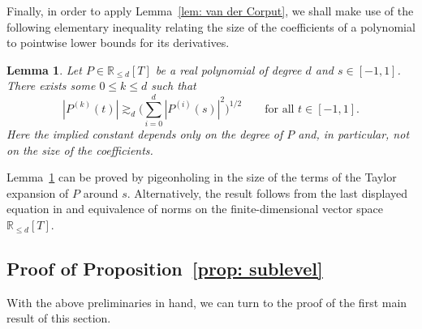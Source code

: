\documentclass[reqno]{amsart}
\numberwithin{equation}{section}
\newcommand{\R}{\mathbb{R}}
\theoremstyle{plain}
\newtheorem{lemma}[theorem]{Lemma}
\theoremstyle{definition}
\begin{document}
Finally, in order to apply Lemma~\ref{lem: van der Corput}, we shall make use of the following elementary inequality relating the size of the coefficients of a polynomial to pointwise lower bounds for its derivatives. 

\begin{lemma}\label{lem: poly bound} Let $P \in \R_{\leq d}[T]$ be a real polynomial of degree $d$ and $s \in [-1,1]$. There exists some $0 \leq k \leq d$ such that
\begin{equation*}
    |P^{(k)}(t)| \gtrsim_d \big(\sum_{i=0}^d |P^{(i)}(s)|^2 \big)^{1/2} \qquad \textrm{for all $t \in [-1,1]$.}
\end{equation*}
Here the implied constant depends only on the degree of $P$ and, in particular, not on the size of the coefficients. 
\end{lemma}

Lemma~\ref{lem: poly bound} can be proved by pigeonholing in the size of the terms of the Taylor expansion of $P$ around $s$. Alternatively, the result follows from the last displayed equation in \cite[p.124]{CRW1998} and equivalence of norms on the finite-dimensional vector space $\R_{\leq d}[T]$. 







\subsection{Proof of Proposition~\ref{prop: sublevel}}\label{subsec: lin ind proof 1} With the above preliminaries in hand, we can turn to the proof of the first main result of this section.
\end{document}
